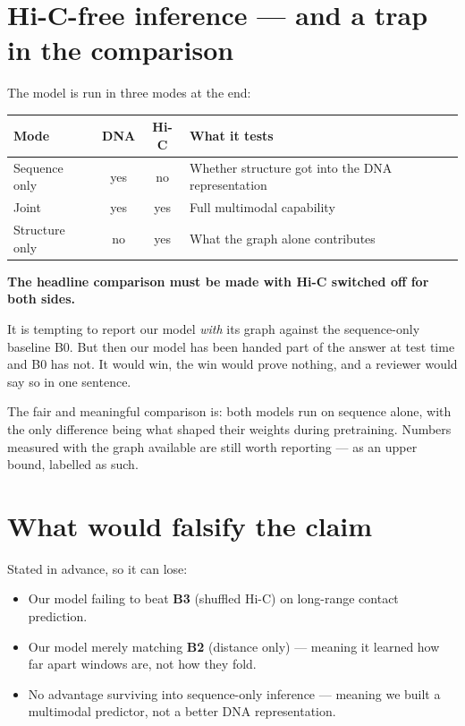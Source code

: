\documentclass[11pt,a4paper]{article}
\begin{document}
\section{Hi-C-free inference --- and a trap in the comparison}
\label{sec:hicfree}

The model is run in three modes at the end:

\begin{center}
\begin{tabular}{l c c l}
\toprule
\textbf{Mode} & \textbf{DNA} & \textbf{Hi-C} & \textbf{What it tests}\\
\midrule
Sequence only & yes & no  & Whether structure got into the DNA representation\\
Joint         & yes & yes & Full multimodal capability\\
Structure only& no  & yes & What the graph alone contributes\\
\bottomrule
\end{tabular}
\end{center}

\begin{carefulbox}
\textbf{The headline comparison must be made with Hi-C switched off for both
sides.}

It is tempting to report our model \emph{with} its graph against the sequence-only
baseline B0. But then our model has been handed part of the answer at test time
and B0 has not. It would win, the win would prove nothing, and a reviewer would
say so in one sentence.

The fair and meaningful comparison is: both models run on sequence alone, with the
only difference being what shaped their weights during pretraining. Numbers
measured with the graph available are still worth reporting --- as an upper bound,
labelled as such.
\end{carefulbox}

\section{What would falsify the claim}

Stated in advance, so it can lose:

\begin{itemize}
\item Our model failing to beat \textbf{B3} (shuffled Hi-C) on long-range contact
      prediction.
\item Our model merely matching \textbf{B2} (distance only) --- meaning it learned
      how far apart windows are, not how they fold.
\item No advantage surviving into sequence-only inference --- meaning we built a
      multimodal predictor, not a better DNA representation.
\end{itemize}
\end{document}
